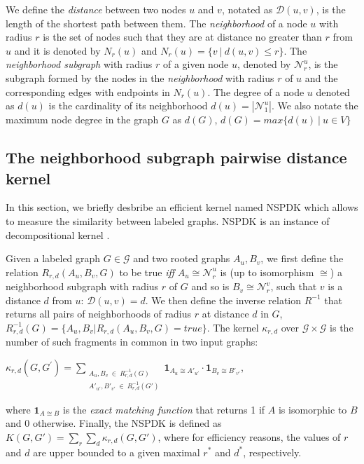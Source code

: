 \documentclass[runningheads,a4paper]{llncs}
\begin{document}
We define the \textit{distance} between two nodes $u$ and $v$, notated as $\mathcal{D}(u,v)$, is the length of the shortest path between them. The \textit{neighborhood} of a node $u$ with radius $r$ is the set of nodes such that they are at distance no greater than $r$ from $u$ and it is denoted by $N_r(u)$ and $N_r(u) = \lbrace v\ |\ d(u,v) \leq r \rbrace$. The \textit{neighborhood subgraph} with radius $r$ of a given node $u$, denoted by $\mathcal{N}_{r}^{u}$, is the subgraph formed by the nodes in the
\textit{neighborhood} with radius $r$ of $u$ and the corresponding edges with endpoints in $N_r(u)$. The degree of a node $u$ denoted as $d(u)$ is the cardinality of its neighborhood $d(u) = |\mathcal{N}_{1}^{u}|$. We also notate the maximum node degree in the graph $G$ as $d(G)$, $d(G) = max\lbrace d(u)\ |\ u \in V \rbrace$
\subsection{The neighborhood subgraph pairwise distance kernel}
In this section, we briefly desbribe an efficient kernel named NSPDK \cite{nspdk} which allows to measure the similarity between labeled graphs. NSPDK is an instance of decompositional kernel \cite{convolution-kernel}.

Given a labeled graph $G \in \mathcal{G}$ and two rooted graphs $A_u, B_v$, we first define the relation $R_{r,d}(A_u, B_v, G)$ to be true {\em iff} $A_u \cong \mathcal{N}_r^u$ is (up to isomorphism $\cong$) a neighborhood subgraph with radius $r$ of $G$ and so is $B_v \cong  \mathcal{N}_r^v$, such that $v$ is a distance $d$ from $u$: $\mathcal{D}(u,v)= d$. We then define the inverse relation $R^{-1}$ that returns all pairs of neighborhoods of radius $r$ at distance $d$ in $G$, $R^{-1}_{r,d}(G) = \lbrace A_u, B_v | R_{r,d}(A_u,B_v,G)=true\rbrace$. The kernel $\kappa_{r,d}$ over $\mathcal{G} \times \mathcal{G}$ is the number of such fragments in common in two input graphs:
\begin{center}
$\kappa_{r,d}(G,G^{'}) = 
\!\!\!\!\!\!\!\!\!\!\!\! 
\sum\limits_{\substack{A_u, B_v \ \in \ R_{r,d}^{-1}(G) \\ 
{A'}_{u'}, {B'}_{v'} \ \in \ R_{r,d}^{-1}(G')
}} \!\!\!\!\!\!\!\!\!\!\!\!  { { \textbf{1}_{A_{u} \cong A'_{u'}}} \cdot {
\textbf{1}_{B_{v} \cong B'_{v'}}} }$, 
\end{center}
\noindent where $\textbf{1}_{A \cong B}$ is the \textit{exact matching function} that returns 1 if $A$ is isomorphic to $B$ and 0 otherwise. Finally, the NSPDK is defined as $K(G,G') = \sum\limits_{r}{\sum\limits_{d}{\kappa_{r,d}(G,G')}}$, where for efficiency reasons, the values of $r$ and $d$ are upper bounded to a given maximal $r^*$ and $d^*$, respectively.
\end{document}

